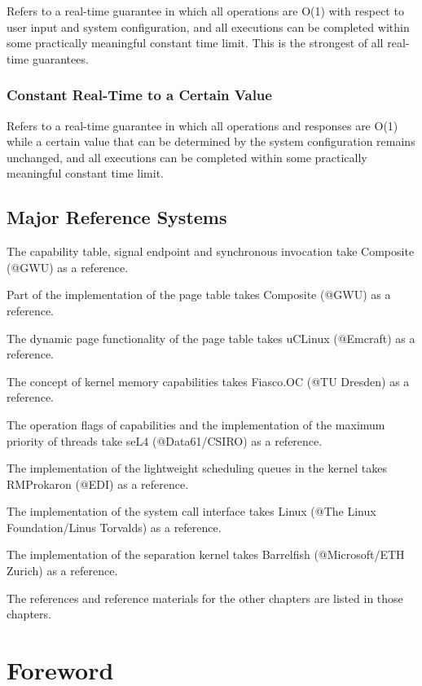 Refers to a real-time guarantee in which all operations are O(1) with respect to user input and system configuration, and all executions can be completed within some practically meaningful constant time limit. This is the strongest of all real-time guarantees.

\subsubsection{Constant Real-Time to a Certain Value}\label{subsubsec:1-value-constant-real-time}

Refers to a real-time guarantee in which all operations and responses are O(1) while a certain value that can be determined by the system configuration remains unchanged, and all executions can be completed within some practically meaningful constant time limit.

\subsection{Major Reference Systems}\label{subsec:1-major-reference-systems}

The capability table, signal endpoint and synchronous invocation take Composite (@GWU) as a reference.

Part of the implementation of the page table takes Composite (@GWU) as a reference.

The dynamic page functionality of the page table takes uCLinux (@Emcraft) as a reference.

The concept of kernel memory capabilities takes Fiasco.OC (@TU Dresden) as a reference.

The operation flags of capabilities and the implementation of the maximum priority of threads take seL4 (@Data61/CSIRO) as a reference.

The implementation of the lightweight scheduling queues in the kernel takes RMProkaron (@EDI) as a reference.

The implementation of the system call interface takes Linux (@The Linux Foundation/Linus Torvalds) as a reference.

The implementation of the separation kernel takes Barrelfish (@Microsoft/ETH Zurich) as a reference.

The references and reference materials for the other chapters are listed in those chapters.

\section{Foreword}\label{sec:1-foreword}

